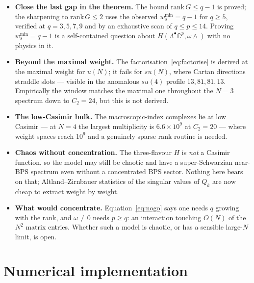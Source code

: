 \documentclass[10pt]{article}
\newcommand{\rank}{\mathrm{rank}\,}
\begin{document}
\begin{itemize}
\item \textbf{Close the last gap in the theorem.} The bound $\rank G\le q-1$ is proved; the sharpening to $\rank G\le2$ uses the observed $w_s^{\min}=q-1$ for $q\ge5$, verified at $q=3,5,7,9$ and by an exhaustive scan of $q\le p\le14$. Proving $w_s^{\min}=q-1$ is a self-contained question about $H(\Lambda^\bullet\mathbb C^p,\omega\wedge)$ with no physics in it.
\item \textbf{Beyond the maximal weight.} The factorisation~\eqref{eq:factorise} is derived at the maximal weight for $u(N)$; it fails for $su(N)$, where Cartan directions straddle slots --- visible in the anomalous $su(4)$ profile $13,81,81,13$. Empirically the window matches the maximal one throughout the $N=3$ spectrum down to $C_2=24$, but this is not derived.
\item \textbf{The low-Casimir bulk.} The macroscopic-index complexes lie at low Casimir --- at $N=4$ the largest multiplicity is $6.6\times10^9$ at $C_2=20$ --- where weight spaces reach $10^9$ and a genuinely sparse rank routine is needed.
\item \textbf{Chaos without concentration.} The three-flavour $H$ is \emph{not} a Casimir function, so the model may still be chaotic and have a super-Schwarzian near-BPS spectrum even without a concentrated BPS sector. Nothing here bears on that; Altland--Zirnbauer statistics of the singular values of $Q_k$ are now cheap to extract weight by weight.
\item \textbf{What would concentrate.} Equation~\eqref{eq:nogo} says one needs $q$ growing with the rank, and $\omega\ne0$ needs $p\ge q$: an interaction touching $O(N)$ of the $N^2$ matrix entries. Whether such a model is chaotic, or has a sensible large-$N$ limit, is open.
\end{itemize}

\section{Numerical implementation}
\end{document}
